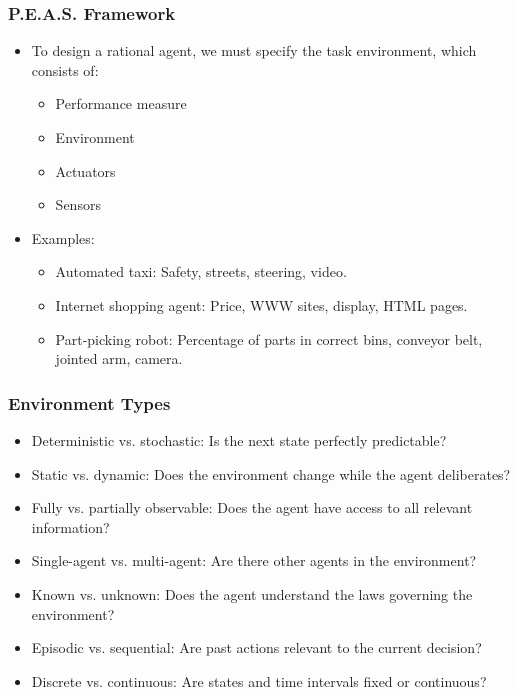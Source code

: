 \documentclass[8pt]{article}
\begin{document}
\subsubsection{P.E.A.S. Framework}
\begin{itemize}
    \item To design a rational agent, we must specify the task environment, which consists of:
    \begin{itemize}
        \item Performance measure
        \item Environment
        \item Actuators
        \item Sensors
    \end{itemize}
    \item Examples:
    \begin{itemize}
        \item Automated taxi: Safety, streets, steering, video.
        \item Internet shopping agent: Price, WWW sites, display, HTML pages.
        \item Part-picking robot: Percentage of parts in correct bins, conveyor belt, jointed arm, camera.
    \end{itemize}
\end{itemize}

\subsubsection{Environment Types}
\begin{itemize}
    \item Deterministic vs. stochastic: Is the next state perfectly predictable?
    \item Static vs. dynamic: Does the environment change while the agent deliberates?
    \item Fully vs. partially observable: Does the agent have access to all relevant information?
    \item Single-agent vs. multi-agent: Are there other agents in the environment?
    \item Known vs. unknown: Does the agent understand the laws governing the environment?
    \item Episodic vs. sequential: Are past actions relevant to the current decision?
    \item Discrete vs. continuous: Are states and time intervals fixed or continuous?
\end{itemize}
\end{document}
